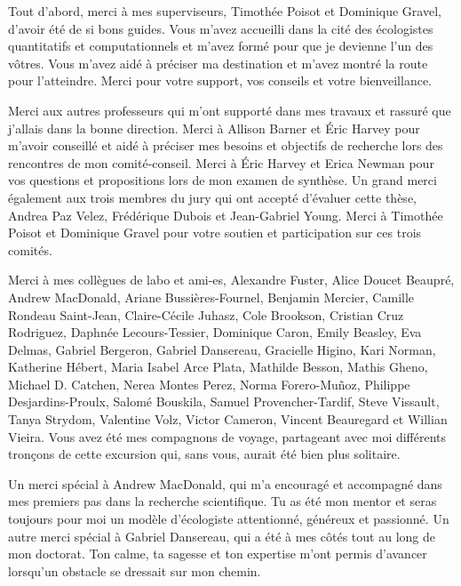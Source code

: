 \documentclass[12pt,twoside,phd]{dms}
\numberwithin{equation}{section}
\numberwithin{table}{chapter}
\numberwithin{figure}{chapter}
\begin{document}
Tout d'abord, merci à mes superviseurs, Timothée Poisot et Dominique Gravel,
d'avoir été de si bons guides. Vous m'avez accueilli dans la cité des
écologistes quantitatifs et computationnels et m'avez formé pour que je devienne
l'un des vôtres. Vous m'avez aidé à préciser ma destination et m'avez
montré la route pour l'atteindre. Merci pour votre support, vos conseils et
votre bienveillance.

Merci aux autres professeurs qui m'ont supporté dans mes travaux et rassuré que
j'allais dans la bonne direction. Merci à Allison Barner et Éric Harvey pour
m'avoir conseillé et aidé à préciser mes besoins et objectifs de recherche lors
des rencontres de mon comité-conseil. Merci à Éric Harvey et Erica Newman pour
vos questions et propositions lors de mon examen de synthèse. Un grand merci
également aux trois membres du jury qui ont accepté d'évaluer cette thèse,
Andrea Paz Velez, Frédérique Dubois et Jean-Gabriel Young. Merci à Timothée
Poisot et Dominique Gravel pour votre soutien et participation sur ces trois
comités.

Merci à mes collègues de labo et ami-es, Alexandre Fuster, Alice Doucet Beaupré,
Andrew MacDonald, Ariane Bussières-Fournel, Benjamin Mercier, Camille Rondeau Saint-Jean, Claire-Cécile
Juhasz, Cole Brookson, Cristian Cruz Rodriguez, Daphnée Lecours-Tessier,
Dominique Caron, Emily Beasley, Eva Delmas, Gabriel Bergeron, Gabriel Dansereau,
Gracielle Higino, Kari Norman, Katherine Hébert, Maria Isabel Arce Plata,
Mathilde Besson, Mathis Gheno, Michael D. Catchen, Nerea Montes Perez, Norma
Forero-Muñoz, Philippe Desjardins-Proulx, Salomé Bouskila, Samuel
Provencher-Tardif, Steve Vissault, Tanya Strydom, Valentine Volz, Victor
Cameron, Vincent Beauregard et Willian Vieira. Vous avez été mes compagnons de
voyage, partageant avec moi différents tronçons de cette excursion qui, sans
vous, aurait été bien plus solitaire. 

Un merci spécial à Andrew MacDonald, qui m'a encouragé et accompagné dans mes
premiers pas dans la recherche scientifique. Tu as été mon mentor et seras
toujours pour moi un modèle d'écologiste attentionné, généreux et passionné.
Un autre merci spécial à Gabriel Dansereau, qui a été à mes côtés tout au
long de mon doctorat. Ton calme, ta sagesse et ton expertise m'ont permis
d'avancer lorsqu'un obstacle se dressait sur mon chemin.
\end{document}
